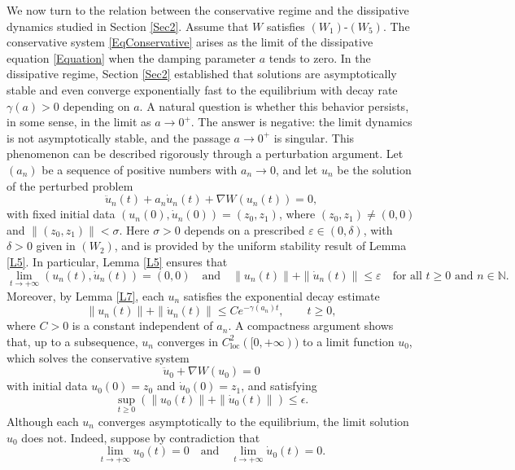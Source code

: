 \documentclass[12pt]{amsart}
\numberwithin{equation}{section}
\begin{document}
We now turn to the relation between the conservative regime and the dissipative dynamics studied in Section \ref{Sec2}. Assume that $W$ satisfies \hyperlink{W1}{$(W_1)$}-\hyperlink{W5}{$(W_5)$}. The conservative system \eqref{EqConservative} arises as the limit of the dissipative equation \eqref{Equation} when the damping parameter $a$ tends to zero. In the dissipative regime, Section \ref{Sec2} established that solutions are asymptotically stable and even converge exponentially fast to the equilibrium with decay rate $\gamma(a)>0$ depending on $a$. A natural question is whether this behavior persists, in some sense, in the limit as $a\to 0^{+}$. The answer is negative: the limit dynamics is not asymptotically stable, and the passage $a\to 0^{+}$ is singular. This phenomenon can be described rigorously through a perturbation argument. Let $(a_n)$ be a sequence of positive numbers with $a_n \to 0$, and let $u_n$ be the solution of the perturbed problem
\begin{equation}\label{EqDamped-n}
	\ddot u_n(t) + a_n \dot u_n(t) + \nabla W(u_n(t)) = 0,
\end{equation}
with fixed initial data $(u_n(0),\dot u_n(0)) = (z_0,z_1)$, where $(z_0,z_1)\neq(0,0)$ and $\|(z_0,z_1)\|<\sigma$. Here $\sigma>0$ depends on a prescribed $\varepsilon\in(0,\delta)$, with $\delta>0$ given in \hyperlink{W2}{\((W_2)\)}, and is provided by the uniform stability result of Lemma \ref{L5}. In particular, Lemma \ref{L5} ensures that
$$
\lim_{t\to+\infty} (u_n(t),\dot u_n(t)) = (0,0)\quad\text{and}\quad\|u_n(t)\| + \|\dot u_n(t)\| \le \varepsilon \quad\text{for all } t\ge 0\text{ and }n\in\mathbb{N}.
$$
Moreover, by Lemma \ref{L7}, each $u_n$ satisfies the exponential decay estimate
\begin{equation}\label{Exp}
	\|u_n(t)\| + \|\dot u_n(t)\|\le C e^{-\gamma(a_n) t}, \qquad t\ge 0,
\end{equation}
where $C>0$ is a constant independent of $a_n$. A compactness argument shows that, up to a subsequence, $u_n$ converges in $C^2_{\mathrm{loc}}([0,+\infty))$ to a limit
function $u_0$, which solves the conservative system
$$
\ddot u_0 + \nabla W(u_0)=0
$$
with initial data $u_0(0)=z_0$ and $\dot u_0(0)=z_1$, and satisfying
\begin{equation*}
	\sup_{t\ge 0}\left(\|u_0(t)\|+\|\dot{u}_0(t)\|\right) \leq \epsilon.
\end{equation*}
Although each $u_n$ converges asymptotically to the equilibrium, the limit solution $u_0$ does not. Indeed, suppose by contradiction that
$$
\lim_{t\to+\infty} u_0(t)=0\quad\text{and}\quad
\lim_{t\to+\infty} \dot u_0(t)=0.
$$
\end{document}
